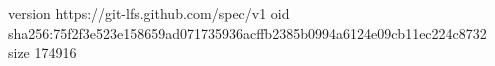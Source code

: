 version https://git-lfs.github.com/spec/v1
oid sha256:75f2f3e523e158659ad071735936acffb2385b0994a6124e09cb11ec224c8732
size 174916
